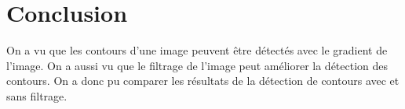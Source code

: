 \documentclass[french,a4paper,10pt]{article}
\begin{document}
    \newpage
    \section{Conclusion}\label{sec:5}

    On a vu que les contours d'une image peuvent être détectés avec le gradient de l'image.
    On a aussi vu que le filtrage de l'image peut améliorer la détection des contours.
    On a donc pu comparer les résultats de la détection de contours avec et sans filtrage.
\end{document}

